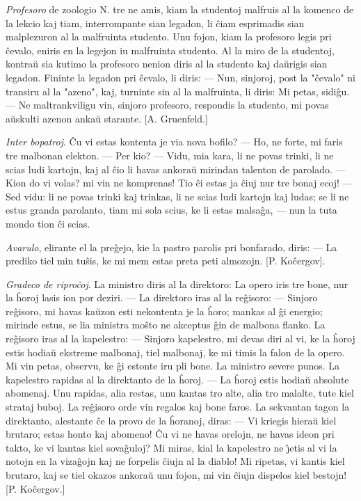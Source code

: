 \emph{Profesoro} de zoologio N. tre ne amis, kiam la studentoj
malfruis al la komenco de la lekcio kaj tiam, interrompante sian
legadon, li \^ciam esprimadis sian malplezuron al la malfruinta
studento. Unu fojon, kiam la profesoro legis pri \^cevalo, eniris en
la legejon iu malfruinta studento. Al la miro de la studentoj,
kontra\u u sia kutimo la profesoro nenion diris al la studento kaj
da\u urigis sian legadon. Fininte la legadon pri \^cevalo, li diris:
--- Nun, sinjoroj, post la "\^cevalo" ni transiru al la "azeno", kaj,
turninte sin al la malfruinta, li diris: Mi petas, sidi\^gu. --- Ne
maltrankviligu vin, sinjoro profesoro, respondis la studento, mi
povas a\u uskulti azenon anka\u u starante. [A. Gruenfeld.]

\emph{Inter bopatroj}. \^Cu vi estas kontenta je via nova bofilo?
--- Ho, ne forte, mi faris tre malbonan elekton. --- Per kio? ---
Vidu, mia kara, li ne povas trinki, li ne scias ludi kartojn, kaj al
\^cio li havas ankora\u u mirindan talenton de parolado. --- Kion do
vi volas? mi vin ne komprenas! Tio \^ci estas ja \^ciuj nur tre
bonaj ecoj! --- Sed vidu: li ne povas trinki kaj trinkas, li ne
scias ludi kartojn kaj ludas; se li ne estus granda parolanto, tiam
mi sola scius, ke li estas malsa\^ga, --- nun la tuta mondo tion
\^ci scias.

\emph{Avarulo}, elirante el la pre\^gejo, kie la pastro parolis pri
bonfarado, diris: --- La prediko tiel min tu\^sis, ke mi mem estas
preta peti almozojn. [P. Ko\^cergov].

\emph{Gradeco de ripro\^coj}. La ministro diris al la direktoro: La
opero iris tre bone, nur la \^horoj lasis ion por deziri. --- La
direktoro iras al la re\^gisoro: --- Sinjoro re\^gisoro, mi havas
ka\u uzon esti nekontenta je la \^horo; mankas al \^gi energio;
mirinde estus, se lia ministra mo\^sto ne akceptus \^gin de malbona
flanko. La re\^gisoro iras al la kapelestro: --- Sinjoro kapelestro,
mi devas diri al vi, ke la \^horoj estis hodia\u u ekstreme
malbonaj, tiel malbonaj, ke mi timis la falon de la opero. Mi vin
petas, observu, ke \^gi estonte iru pli bone. La ministro severe
punos. La kapelestro rapidas al la direktanto de la \^horoj. --- La
\^horoj estis hodia\u u absolute abomenaj. Unu rapidas, alia restas,
unu kantas tro alte, alia tro malalte, tute kiel strataj buboj. La
re\^gisoro orde vin regalos kaj bone faros. La sekvantan tagon la
direktanto, alestante \^ce la provo de la \^horanoj, diras: --- Vi
kriegis hiera\u u kiel brutaro; estas honto kaj abomeno! \^Cu vi ne
havas orelojn, ne havas ideon pri takto, ke vi kantas kiel
sova\^guloj? Mi miras, kial la kapelestro ne \^{\j}etis al vi la
notojn en la viza\^gojn kaj ne forpelis \^ciujn al la diablo! Mi
ripetas, vi kantis kiel brutaro, kaj se tiel okazos ankora\u u unu
fojon, mi vin \^ciujn dispelos kiel bestojn! [P. Ko\^cergov.]

